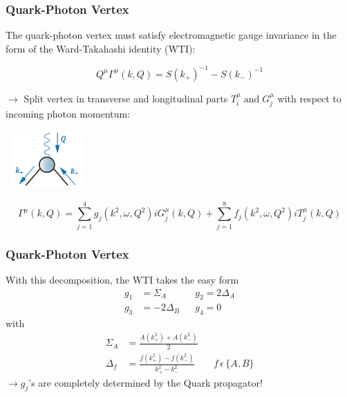 \begin{frame}
    \frametitle{Quark-Photon Vertex}
    The quark-photon vertex must satisfy electromagnetic gauge invariance in the form of the
    Ward-Takahashi identity (WTI):

    \begin{equation}\label{eq:2}
        Q^\mu\Gamma^\mu(k, Q)=S(k_+)^{-1}-S(k_-)^{-1}
    \end{equation}

    \begin{minipage}[r]{0.65\textwidth}
        $\rightarrow$ Split vertex in transverse and longitudinal parts $T_i^{\mu} \; \text{and} \; G_j^{\mu} $ with respect to incoming photon momentum:
    \end{minipage}
    \begin{minipage}[r]{0.30\textwidth}
        \hspace{2mm}
        \includegraphics[height=2.2cm, width=3.2cm]{graphics/Vertex}
    \end{minipage}

    \begin{equation}\label{eq:3}
        \Gamma^\mu(k,Q)=\sum_{j=1}^4 g_j(k^2, \omega, Q^2)iG^\mu_j(k, Q)+\sum_{j=1}^8 f_j(k^2, \omega, Q^2)iT^\mu_j(k, Q)
    \end{equation}
\end{frame}

\begin{frame}
    \frametitle{Quark-Photon Vertex}
    With this decomposition, the WTI takes the easy form
    \begin{align}
        g_1 &= \Sigma_A && g_2=2\Delta_A \\\nonumber
        g_3&= -2\Delta_B && g_4=0
    \end{align}
    with
    \begin{align}
        \Sigma_A&=\frac{A(k_+^2) + A(k_-^2)}{2} \\\nonumber
        \Delta_f&=\frac{f(k_+^{2}) - f(k_-^2)}{k_+^2 - k_{-}^2} && f\, \epsilon \, \lbrace A,B \rbrace
    \end{align}
    $\rightarrow g_j$'s are completely determined by the Quark propagator!
\end{frame}


\endinput

